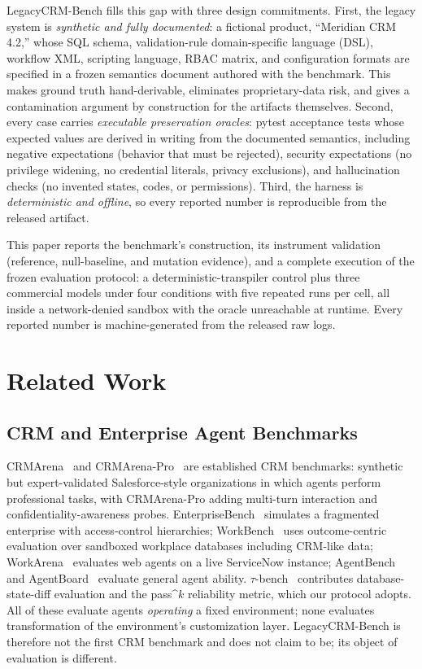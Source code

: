 \documentclass[journal]{IEEEtran}
\begin{document}
LegacyCRM-Bench fills this gap with three design commitments. First, the legacy system is
\emph{synthetic and fully documented}: a fictional product, ``Meridian CRM 4.2,'' whose SQL
schema, validation-rule domain-specific language (DSL), workflow XML, scripting language,
RBAC matrix, and configuration
formats are specified in a frozen semantics document authored with the benchmark. This makes
ground truth hand-derivable, eliminates proprietary-data risk, and gives a contamination
argument by construction for the artifacts themselves. Second, every case carries
\emph{executable preservation oracles}: pytest acceptance tests whose expected values are
derived in writing from the documented semantics, including negative expectations (behavior
that must be rejected), security expectations (no privilege widening, no credential literals,
privacy exclusions), and hallucination checks (no invented states, codes, or permissions).
Third, the harness is \emph{deterministic and offline}, so every reported number is
reproducible from the released artifact.

This paper reports the benchmark's construction, its instrument validation (reference,
null-baseline, and mutation evidence), and a complete execution of the frozen evaluation
protocol: a deterministic-transpiler control plus three commercial models under four
conditions with five repeated runs per cell, all inside a network-denied sandbox with the
oracle unreachable at runtime. Every reported number is machine-generated from the released
raw logs.

\section{Related Work}
\label{sec:related}
\subsection{CRM and Enterprise Agent Benchmarks}
CRMArena~\cite{huang2025crmarena} and CRMArena-Pro~\cite{huang2025crmarenapro} are established
CRM benchmarks: synthetic but expert-validated Salesforce-style organizations in which agents
perform professional tasks, with CRMArena-Pro adding multi-turn interaction and
confidentiality-awareness probes. EnterpriseBench~\cite{vishwakarma2025enterprisebench}
simulates a fragmented enterprise with access-control hierarchies; WorkBench~\cite{styles2024workbench}
uses outcome-centric evaluation over sandboxed workplace databases including CRM-like data;
WorkArena~\cite{drouin2024workarena} evaluates web agents on a live ServiceNow instance;
AgentBench~\cite{liu2023agentbench} and AgentBoard~\cite{ma2024agentboard} evaluate general
agent ability. $\tau$-bench~\cite{yao2024taubench} contributes database-state-diff evaluation
and the pass\textasciicircum{}$k$ reliability metric, which our protocol adopts. All of these
evaluate agents \emph{operating} a fixed environment; none evaluates transformation of the
environment's customization layer. LegacyCRM-Bench is therefore not the first CRM benchmark and
does not claim to be; its object of evaluation is different.
\end{document}
